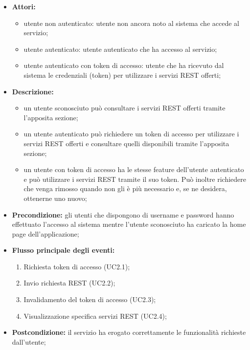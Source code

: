 \begin{itemize}
	\item \textbf{Attori:}
	\begin{itemize}
		\item utente non autenticato: utente non ancora noto al sistema che accede al servizio;
		\item utente autenticato: utente autenticato che ha accesso al servizio;
		\item utente autenticato con token di accesso: utente che ha ricevuto dal sistema le credenziali (token) per utilizzare i servizi REST offerti;
	\end{itemize}
	\item \textbf{Descrizione:}
	\begin{itemize}
		\item un utente sconosciuto può consultare i servizi REST offerti tramite l'apposita sezione;
		\item un utente autenticato può richiedere un token di accesso per utilizzare i servizi REST offerti e consultare quelli disponibili tramite l'apposita sezione;
		\item un utente con token di accesso ha le stesse feature dell'utente autenticato e può utilizzare i servizi REST tramite il suo token. Può inoltre richiedere che venga rimosso quando non gli è più necessario e, se ne desidera, ottenerne uno nuovo;
	\end{itemize}
	\item \textbf{Precondizione:} gli utenti che dispongono di username e password hanno effettuato l'accesso al sistema mentre l'utente sconosciuto ha caricato la home page dell'applicazione;
	\item \textbf{Flusso principale degli eventi:}
	\begin{enumerate}
		\item Richiesta token di accesso (UC2.1);
		\item Invio richiesta REST (UC2.2);
		\item Invalidamento del token di accesso (UC2.3);
		\item Visualizzazione specifica servizi REST (UC2.4);
	\end{enumerate}
	\item \textbf{Postcondizione:} il servizio ha erogato correttamente le funzionalità richieste dall'utente;
\end{itemize}

\pagebreak


